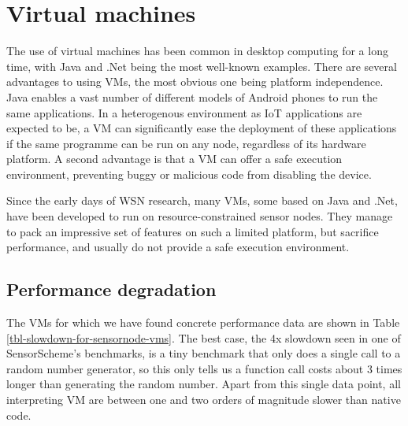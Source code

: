 \section{Virtual machines}
The use of virtual machines has been common in desktop computing for a long time, with Java and .Net being the most well-known examples. There are several advantages to using VMs, the most obvious one being platform independence. Java enables a vast number of different models of Android phones to run the same applications. In a heterogenous environment as IoT applications are expected to be, a VM can significantly ease the deployment of these applications if the same programme can be run on any node, regardless of its hardware platform. A second advantage is that a VM can offer a safe execution environment, preventing buggy or malicious code from disabling the device.


Since the early days of WSN research, many VMs, some based on Java and .Net, have been developed to run on resource-constrained sensor nodes. They manage to pack an impressive set of features on such a limited platform, but sacrifice performance, and usually do not provide a safe execution environment.

\subsection{Performance degradation}
\label{sec-introduction-performance}
The VMs for which we have found concrete performance data are shown in Table \ref{tbl-slowdown-for-sensornode-vms}. The best case, the 4x slowdown seen in one of SensorScheme's benchmarks, is a tiny benchmark that only does a single call to a random number generator, so this only tells us a function call costs about 3 times longer than generating the random number. Apart from this single data point, all interpreting VM are between one and two orders of magnitude slower than native code.

